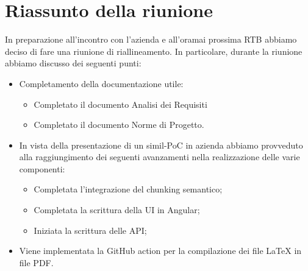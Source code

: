 \section{Riassunto della riunione}
In preparazione all'incontro con l'azienda e all'oramai prossima RTB abbiamo deciso di fare una riunione di riallineamento. In particolare, durante la riunione abbiamo discusso dei seguenti punti:
\begin{itemize}
    \item Completamento della documentazione utile:
    \begin{itemize}
        \item Completato il documento Analisi dei Requisiti
        \item Completato il documento Norme di Progetto.
    \end{itemize}
    \item In vista della presentazione di un simil-PoC in azienda abbiamo provveduto alla raggiungimento dei seguenti avanzamenti nella realizzazione delle varie componenti:
    \begin{itemize}
        \item Completata l'integrazione del chunking semantico;
        \item Completata la scrittura della UI in Angular;
        \item Iniziata la scrittura delle API;
    \end{itemize}
    \item Viene implementata la GitHub action per la compilazione dei file LaTeX in file PDF.

\end{itemize}